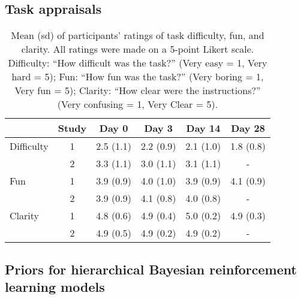 \documentclass[a4paper,12pt]{article}
\begin{document}
\begin{refsection}[supp]
\clearpage
\subsection*{Task appraisals}

\begin{table}[h!]
    \centering
    \begin{tabular}{lccccc}
    \toprule
               & Study &   Day 0 &      Day 3 &     Day 14 &     Day 28 \\
    \midrule
    Difficulty &  1 &  2.5 (1.1) &  2.2 (0.9) &  2.1 (1.0) &  1.8 (0.8) \\
               &  2 &  3.3 (1.1) &  3.0 (1.1) &  3.1 (1.1) &          - \\
    \midrule
    Fun        &  1 &  3.9 (0.9) &  4.0 (1.0) &  3.9 (0.9) &  4.1 (0.9) \\
               &  2 &  3.9 (0.9) &  4.1 (0.8) &  4.0 (0.8) &          - \\
    \midrule
    Clarity    &  1 &  4.8 (0.6) &  4.9 (0.4) &  5.0 (0.2) &  4.9 (0.3) \\
               &  2 &  4.9 (0.5) &  4.9 (0.2) &  4.9 (0.2) &          - \\
    \bottomrule
    \end{tabular}
    \caption{Mean (sd) of participants' ratings of task difficulty, fun, and clarity. All ratings were made on a 5-point Likert scale. Difficulty: ``How difficult was the task?'' (Very easy = 1, Very hard = 5); Fun: ``How fun was the task?'' (Very boring = 1, Very fun = 5); Clarity: ``How clear were the instructions?'' (Very confusing = 1, Very Clear = 5).}
    \label{tab:appraisals}
\end{table}

\clearpage
\subsection*{Priors for hierarchical Bayesian reinforcement learning models}


\end{refsection}
\end{document}
